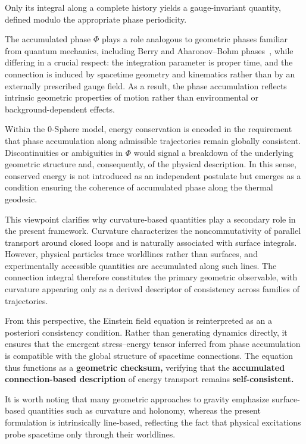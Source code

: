 \documentclass[%
 reprint,
 amsmath,amssymb,
 aps,
 prb,
]{revtex4-2}
\numberwithin{equation}{section}
\begin{document}
Only its integral along a complete history yields a gauge-invariant quantity, defined modulo the appropriate phase periodicity.

The accumulated phase $\Phi$ plays a role analogous to geometric phases familiar from quantum mechanics, including Berry and Aharonov--Bohm phases~\cite{Berry1984}, while differing in a crucial respect: the integration parameter is proper time, and the connection is induced by spacetime geometry and kinematics rather than by an externally prescribed gauge field. As a result, the phase accumulation reflects intrinsic geometric properties of motion rather than environmental or background-dependent effects.

Within the 0-Sphere model, energy conservation is encoded in the requirement that phase accumulation along admissible trajectories remain globally consistent. Discontinuities or ambiguities in $\Phi$ would signal a breakdown of the underlying geometric structure and, consequently, of the physical description. In this sense, conserved energy is not introduced as an independent postulate but emerges as a condition ensuring the coherence of accumulated phase along the thermal geodesic.

This viewpoint clarifies why curvature-based quantities play a secondary role in the present framework. Curvature characterizes the noncommutativity of parallel transport around closed loops and is naturally associated with surface integrals. However, physical particles trace worldlines rather than surfaces, and experimentally accessible quantities are accumulated along such lines. The connection integral therefore constitutes the primary geometric observable, with curvature appearing only as a derived descriptor of consistency across families of trajectories.

From this perspective, the Einstein field equation is reinterpreted as an a posteriori consistency condition. Rather than generating dynamics directly, it ensures that the emergent stress--energy tensor inferred from phase accumulation is compatible with the global structure of spacetime connections. The equation thus functions as a \textbf{geometric checksum,} verifying that the \textbf{accumulated connection-based description} of energy transport remains \textbf{self-consistent.}

It is worth noting that many geometric approaches to gravity emphasize surface-based quantities such as curvature and holonomy, whereas the present formulation is intrinsically line-based, reflecting the fact that physical excitations probe spacetime only through their worldlines.
\end{document}
